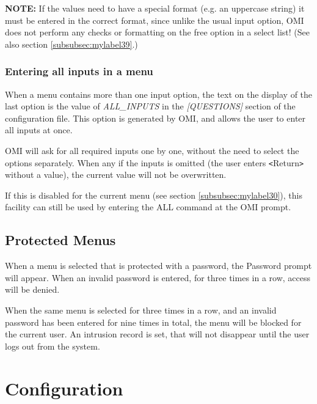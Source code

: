 \documentclass[a4paper]{book}
\newcommand{\vs}{\vspace{3mm}}
\newcommand{\lt}{\texttt{<}}
\newcommand{\gt}{\texttt{>}}
\begin{document}
\vs 

\hspace{-8mm}\textbf{NOTE:} If the values need to have a special format (e.g. an 
uppercase string) it must be entered in the correct format, since unlike the 
usual input option, OMI does not perform any checks or formatting on the 
free option in a select list! (See also section \ref{subsubsec:mylabel39}.)

\subsection{Entering all inputs in a menu}
\label{subsubsec:entering}

When a menu contains more than one input option, the text on the display of the last 
option is the value of \textsl{ALL{\_}INPUTS}  in the 
\textsl{[QUESTIONS]} section of the configuration file. This option is generated by 
OMI, and allows the user to enter all inputs at once.

\vs

OMI will ask for all required inputs one by one, without the need to select 
the options separately. When any if the inputs is omitted (the user enters 
\lt Return\gt{} without a value), the current value will not be overwritten.

If this is disabled for the current menu (see section \ref{subsubsec:mylabel30}),
this facility can still be used by entering the \textsf{ALL} command at the OMI prompt.

\section{Protected Menus}
\label{subsec:protected}

When a menu is selected that is protected with a password, the Password 
prompt will appear. When an invalid password is entered, for three times in 
a row, access will be denied.

\vs

When the same menu is selected for three times in a row, and an invalid 
password has been entered for nine times in total, the menu will be blocked 
for the current user. An intrusion record is set, that will not disappear 
until the user logs out from the system.

\chapter{Configuration}
\label{sec:configuration}
\end{document}

